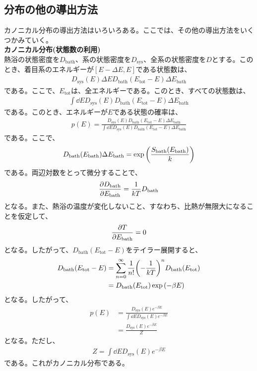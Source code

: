 \documentclass[a4paper,11pt]{jsarticle}
\numberwithin{equation}{section}
\begin{document}
\subsection{分布の他の導出方法}
カノニカル分布の導出方法はいろいろある。ここでは、その他の導出方法をいくつかみていく。\\
\textbf{カノニカル分布(状態数の利用)}\\
熱浴の状態密度を$D_{\text{bath}}$、系の状態密度を$D_{\text{sys}}$、全系の状態密度を$D$とする。このとき、着目系のエネルギーが$[E-\Delta E,E]$である状態数は、
\begin{align}
  D_{\text{sys}}(E)\Delta E D_{\text{bath}}(E_{\text{tot}}-E)\Delta E_{\text{bath}}
\end{align}
である。ここで、$E_{\text{tot}}$は、全エネルギーである。このとき、すべての状態数は、
\begin{align}
  \int \dd E D_{\text{sys}}(E)D_{\text{bath}}(E_{\text{tot}}-E)\Delta E_{\text{bath}}
\end{align}
である。このとき、エネルギーが$E$である状態の確率は、
\begin{align}
  p(E) = \frac{D_{\text{sys}}(E)D_{\text{bath}}(E_{\text{tot}}-E)\Delta E_{\text{bath}}}{\int \dd E D_{\text{sys}}(E)D_{\text{bath}}(E_{\text{tot}}-E)\Delta E_{\text{bath}}}
\end{align}
である。ここで、
\begin{align}
  D_{\text{bath}}(E_{\text{bath}})\Delta E_{\text{bath}} = \exp \qty(\frac{S_{\text{bath}}(E_{\text{bath}})}{k})
\end{align}
である。両辺対数をとって微分することで、
\begin{align}
  \pdv{D_{\text{bath}}}{E_{\text{bath}}} = \frac{1}{kT}D_{\text{bath}}
\end{align}
となる。また、熱浴の温度が変化しないこと、すなわち、比熱が無限大になることを仮定して、
\begin{align}
  \pdv{T}{E_{\text{bath}}} = 0
\end{align}
となる。したがって、$D_{\text{bath}}(E_{\text{tot}}-E)$をテイラー展開すると、
\begin{align}
  D_{\text{bath}}(E_{\text{tot}}-E) &= \sum_{n=0}^{\infty}\frac{1}{n!}\qty(-\frac{1}{kT})^n D_{\text{bath}}(E_{\text{tot}})\\
  &= D_{\text{bath}}(E_{\text{tot}})\exp\qty(-\beta E)
\end{align}
となる。したがって、
\begin{align}
  p(E) &= \frac{D_{\text{sys}}(E) e^{-\beta E}}{\int \dd E D_{\text{sys}}(E) e^{-\beta E}}\\
  &= \frac{D_{\text{sys}}(E) e^{-\beta E}}{Z}
\end{align}
となる。ただし、
\begin{align}
  Z = \int \dd E D_{\text{sys}}(E) e^{-\beta E}
\end{align}
である。これがカノニカル分布である。\\
\end{document}
